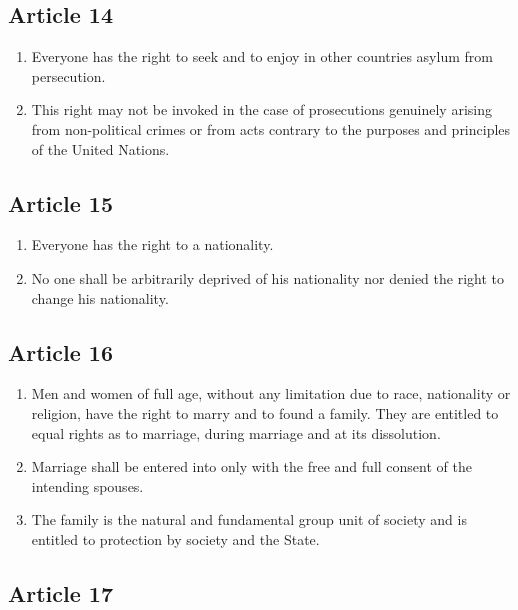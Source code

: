 \documentclass[
  titlepage,
  openright,
  DIV=calc,
  toc=listof,
  listof=nochaptergap]{scrbook}
\begin{document}
\hypertarget{article-14-1}{%
\subsection{Article 14}\label{article-14-1}}

\begin{enumerate}
\def\labelenumi{\arabic{enumi}.}
\item
  Everyone has the right to seek and to enjoy in other countries asylum
  from persecution.
\item
  This right may not be invoked in the case of prosecutions genuinely
  arising from non-political crimes or from acts contrary to the
  purposes and principles of the United Nations.
\end{enumerate}

\hypertarget{article-15-1}{%
\subsection{Article 15}\label{article-15-1}}

\begin{enumerate}
\def\labelenumi{\arabic{enumi}.}
\item
  Everyone has the right to a nationality.
\item
  No one shall be arbitrarily deprived of his nationality nor denied the
  right to change his nationality.
\end{enumerate}

\hypertarget{article-16-1}{%
\subsection{Article 16}\label{article-16-1}}

\begin{enumerate}
\def\labelenumi{\arabic{enumi}.}
\item
  Men and women of full age, without any limitation due to race,
  nationality or religion, have the right to marry and to found a
  family. They are entitled to equal rights as to marriage, during
  marriage and at its dissolution.
\item
  Marriage shall be entered into only with the free and full consent of
  the intending spouses.
\item
  The family is the natural and fundamental group unit of society and is
  entitled to protection by society and the State.
\end{enumerate}

\hypertarget{article-17-1}{%
\subsection{Article 17}\label{article-17-1}}
\end{document}

